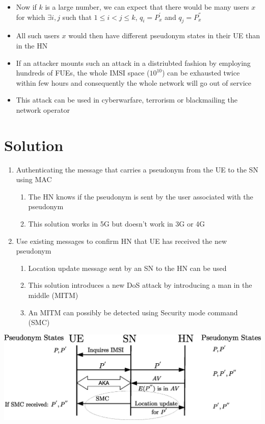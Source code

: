 \documentclass[portrait,a0]{a0poster}
\begin{document}
\begin{multicols}{2}
\begin{itemize}
\item Now if $k$ is a large number, we can expect that there would be many users $x$ for which $\exists i,j$ such that $1 \leq i < j \leq k$, $q_i=P_x^{'}$ and $q_j=P_x^{''}$
\item  All such users $x$ would then have different pseudonym states in their UE than in the HN
\item If an attacker mounts such an attack in a distriubted fashion by employing hundreds of FUEs, the whole IMSI space ($10^{10}$) can be exhausted twice within few hours and consequently the whole network will go out of service
\item This attack can be used in cyberwarfare, terrorism or blackmailing the network operator
\end{itemize}

\section{Solution}
\begin{enumerate}
\item Authenticating the message that carries a pseudonym from the UE to the SN using MAC 
\begin{enumerate}
\item The HN knows if the pseudonym is sent by the user associated with the pseudonym
\item This solution works in 5G but doesn't work in 3G or 4G  
\end{enumerate}
\item Use existing messages to confirm HN that UE has received the new pseudonym
\begin{enumerate}
\item Location update message sent by an SN to the HN can be used 
\item This solution introduces a new DoS attack by introducing a man in the middle (MITM)
\item An MITM can possibly be detected using Security mode command (SMC) 
\end{enumerate}
\end{enumerate}

\begin{center}
\begin{minipage}[t]{0.9\linewidth} %
\vspace{0cm} %
\includegraphics[width=1\linewidth]{solution.eps}
\hspace{0pt}
\vspace{0cm} %
\end{minipage} 
\end{center}


\end{multicols}
\end{document}

